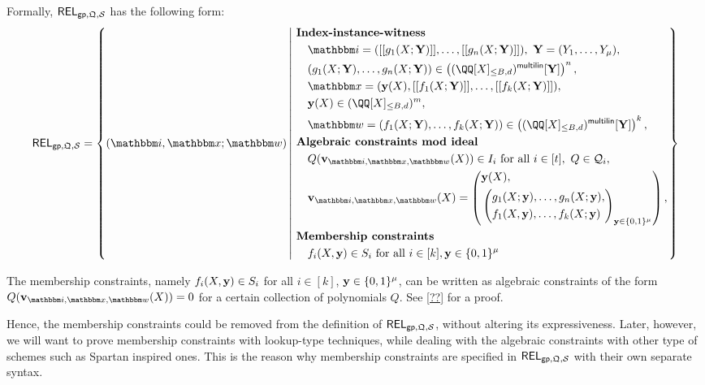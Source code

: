 \documentclass[11pt,letterpaper,usenames,dvipsnames]{article}
\begin{document}
%
    Formally, $\mathsf{REL}_{\mathsf{gp},\mathfrak{Q}, \mathcal{S}}$ has the following form:
    \begin{equation*}
    \begin{aligned}
    \REL_{\gparams,\megaQ,\cS} = \left\{ (\idx, \inp ; \wit) \left| \ \begin{aligned}
    &\textbf{Index-instance-witness}\\
    &\quad \idx = ( \oracle{g_1(X;\YY)},\ldots, \oracle{g_n(X;\YY)}), \ \YY=(Y_1,\ldots, Y_\mu), \\
            &\quad(g_1(X;\YY),\dots,g_n(X;\YY))\in \left(\mainQpolyringmultilin[\YY]\right)^{n},\\
    &\quad \inp =(\yy(X), \oracle{f_1(X;\YY)}, \ldots, \oracle{f_k(X;\YY)}),\\ &\quad \yy(X)\in \mainQpolyring^{m},\\    
        &\quad \wit = (f_1(X;\YY), \ldots, f_k(X;\YY)) \in \left(\mainQpolyringmultilin[\YY]\right)^{k},\\
        &\textbf{Algebraic constraints mod ideal}\\
        &\quad Q(\vv_{\idx, \inp,\wit}(X)) \in I_i  \text{ for all } i\in [t], \ Q\in \cQ_i,\\
        &\quad \vv_{\idx, \inp,\wit}(X) = \left(\begin{aligned}&\yy(X),\\ &\left(\begin{aligned}&g_1(X;\yy),\ldots, g_n(X;\yy),\\ &f_1(X,\yy),\ldots, f_k(X;\yy)\end{aligned}\right)_{\yy\in \BB^\mu}\\
     \end{aligned}\right),\\
     &\textbf{Membership constraints}\\
        &\quad f_i(X,\yy)\in S_i \text{ for all } i\in [k], \yy\in \{0,1\}^\mu
    \end{aligned} \right.\right\}
    \end{aligned}
    \end{equation*}

    \begin{remark}
    The membership constraints, namely $f_i(X,\mathbf{y}) \in S_i$ for all $i\in [k]$, $\mathbf{y}\in \{0,1\}^\mu$, can be written as algebraic constraints of the form $Q(\vv_{\idx,\inp,\wit}(X))=0$ for a certain collection of polynomials $Q$. See \cref{??} for a proof. 
    
    Hence, the membership constraints could be removed from the definition of $\mathsf{REL}_{\mathsf{gp}, \mathfrak{Q}, \mathcal{S}}$,  without altering its expressiveness. Later, however, we will want to prove membership constraints with lookup-type techniques, while dealing with the algebraic constraints with other type of schemes such as Spartan \cite{spartan} inspired ones. This is the reason why membership constraints are specified in $\mathsf{REL}_{\mathsf{gp},\mathfrak{Q}, \mathcal{S}}$ with their own separate syntax.
    \end{remark}
\end{document}
